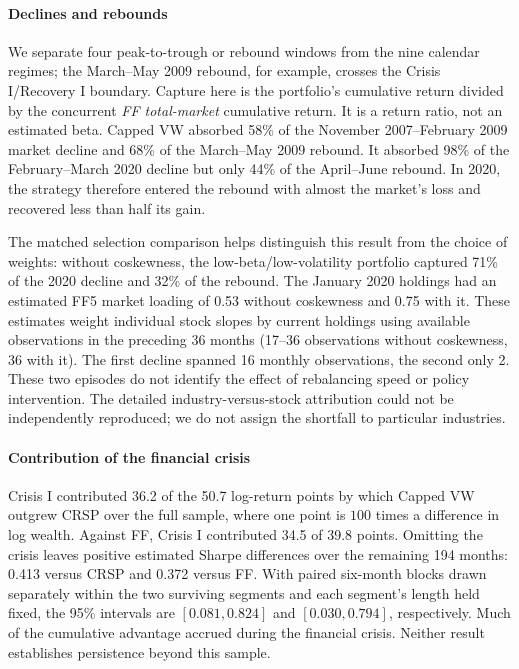 \documentclass[letterpaper,journal]{IEEEtran}
\begin{document}
\paragraph{Declines and rebounds}
We separate four peak-to-trough or rebound windows from the nine calendar regimes; the March--May 2009 rebound, for example, crosses the Crisis I/Recovery I boundary. Capture here is the portfolio’s cumulative return divided by the concurrent \emph{FF total-market} cumulative return. It is a return ratio, not an estimated beta. Capped VW absorbed 58\% of the November 2007--February 2009 market decline and 68\% of the March--May 2009 rebound. It absorbed 98\% of the February--March 2020 decline but only 44\% of the April--June rebound. In 2020, the strategy therefore entered the rebound with almost the market’s loss and recovered less than half its gain.

The matched selection comparison helps distinguish this result from the choice of weights: without coskewness, the low-beta/low-volatility portfolio captured 71\% of the 2020 decline and 32\% of the rebound. The January 2020 holdings had an estimated FF5 market loading of 0.53 without coskewness and 0.75 with it. These estimates weight individual stock slopes by current holdings using available observations in the preceding 36 months (17--36 observations without coskewness, 36 with it). The first decline spanned 16 monthly observations, the second only 2. These two episodes do not identify the effect of rebalancing speed or policy intervention. The detailed industry-versus-stock attribution could not be independently reproduced; we do not assign the shortfall to particular industries.

\paragraph{Contribution of the financial crisis}
Crisis I contributed 36.2 of the 50.7 log-return points by which Capped VW outgrew CRSP over the full sample, where one point is $100$ times a difference in log wealth. Against FF, Crisis I contributed 34.5 of 39.8 points. Omitting the crisis leaves positive estimated Sharpe differences over the remaining 194 months: 0.413 versus CRSP and 0.372 versus FF. With paired six-month blocks drawn separately within the two surviving segments and each segment’s length held fixed, the 95\% intervals are $[0.081,0.824]$ and $[0.030,0.794]$, respectively. Much of the cumulative advantage accrued during the financial crisis. Neither result establishes persistence beyond this sample.
\end{document}
